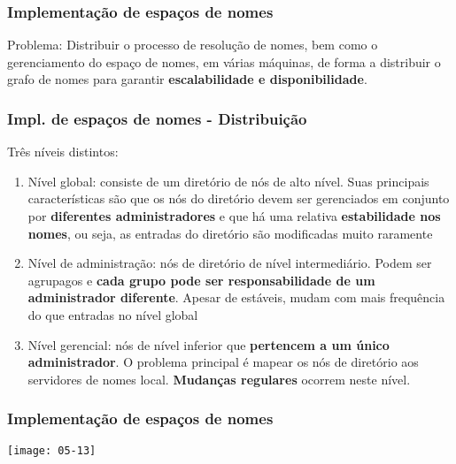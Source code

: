 \documentclass[Ligatures=TeX,table,brazil,svgnames,usetotalslideindicator,compress,10pt]{beamer}
\begin{document}
\begin{frame}
  \frametitle{Implementação de espaços de nomes}
  \begin{block}{Problema:}
    Distribuir o processo de resolução de nomes, bem como o
    gerenciamento do espaço de nomes, em várias máquinas, de forma a
    distribuir o grafo de nomes para garantir\textbf{ escalabilidade e
    disponibilidade}.
  \end{block}
\end{frame}

\begin{frame}
  \frametitle{Impl. de espaços de nomes - Distribuição}
  \begin{block}{Três níveis distintos:}
    \begin{enumerate}
    \item \alert{Nível global:} consiste de um diretório de nós de
      alto nível. Suas principais características são que os nós do
      diretório devem ser gerenciados em conjunto por
      \textbf{diferentes administradores} e que há uma relativa
      \textbf{estabilidade nos nomes}, ou seja, as entradas do
      diretório são modificadas muito raramente
    \item \alert{Nível de administração:} nós de diretório de nível
      intermediário. Podem ser agrupagos e \textbf{cada grupo
      pode ser responsabilidade de um administrador diferente}. Apesar de
      estáveis, mudam com mais frequência do que entradas no nível
      global
    \item \alert{Nível gerencial:} nós de nível inferior que
      \textbf{pertencem a um único administrador}. O problema
      principal é mapear os nós de diretório aos servidores de nomes
      local. \textbf{Mudanças regulares} ocorrem neste nível.
    \end{enumerate}
  \end{block}
\end{frame}

\begin{frame}
  \frametitle{Implementação de espaços de nomes}
  \texttt{[image: 05-13]}
\end{frame}
\end{document}
